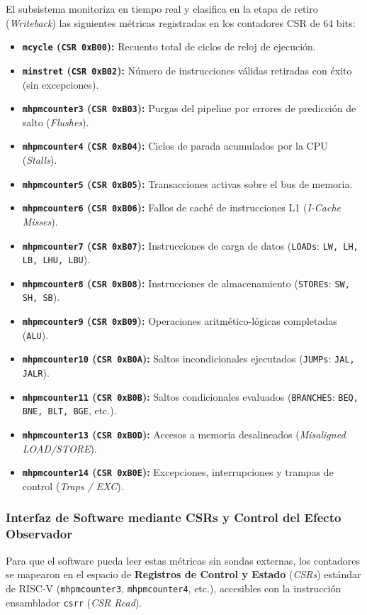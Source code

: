 \documentclass[10pt,a4paper]{article}
\begin{document}
El subsistema monitoriza en tiempo real y clasifica en la etapa de retiro (\textit{Writeback}) las siguientes métricas registradas en los contadores CSR de 64 bits:

\begin{itemize}
    \item \textbf{\texttt{mcycle} (\texttt{CSR 0xB00}):} Recuento total de ciclos de reloj de ejecución.
    \item \textbf{\texttt{minstret} (\texttt{CSR 0xB02}):} Número de instrucciones válidas retiradas con éxito (sin excepciones).
    \item \textbf{\texttt{mhpmcounter3} (\texttt{CSR 0xB03}):} Purgas del pipeline por errores de predicción de salto (\textit{Flushes}).
    \item \textbf{\texttt{mhpmcounter4} (\texttt{CSR 0xB04}):} Ciclos de parada acumulados por la CPU (\textit{Stalls}).
    \item \textbf{\texttt{mhpmcounter5} (\texttt{CSR 0xB05}):} Transacciones activas sobre el bus de memoria.
    \item \textbf{\texttt{mhpmcounter6} (\texttt{CSR 0xB06}):} Fallos de caché de instrucciones L1 (\textit{I-Cache Misses}).
    \item \textbf{\texttt{mhpmcounter7} (\texttt{CSR 0xB07}):} Instrucciones de carga de datos (\texttt{LOADs}: \texttt{LW, LH, LB, LHU, LBU}).
    \item \textbf{\texttt{mhpmcounter8} (\texttt{CSR 0xB08}):} Instrucciones de almacenamiento (\texttt{STOREs}: \texttt{SW, SH, SB}).
    \item \textbf{\texttt{mhpmcounter9} (\texttt{CSR 0xB09}):} Operaciones aritmético-lógicas completadas (\texttt{ALU}).
    \item \textbf{\texttt{mhpmcounter10} (\texttt{CSR 0xB0A}):} Saltos incondicionales ejecutados (\texttt{JUMPs}: \texttt{JAL, JALR}).
    \item \textbf{\texttt{mhpmcounter11} (\texttt{CSR 0xB0B}):} Saltos condicionales evaluados (\texttt{BRANCHES}: \texttt{BEQ, BNE, BLT, BGE}, etc.).
    \item \textbf{\texttt{mhpmcounter13} (\texttt{CSR 0xB0D}):} Accesos a memoria desalineados (\textit{Misaligned LOAD/STORE}).
    \item \textbf{\texttt{mhpmcounter14} (\texttt{CSR 0xB0E}):} Excepciones, interrupciones y trampas de control (\textit{Traps / EXC}).
\end{itemize}

\subsubsection{Interfaz de Software mediante CSRs y Control del Efecto Observador}
Para que el software pueda leer estas métricas sin sondas externas, los contadores se mapearon en el espacio de \textbf{Registros de Control y Estado} 
(\textit{CSRs}) estándar de RISC-V \cite{riscv_spec} (\texttt{mhpmcounter3}, \texttt{mhpmcounter4}, etc.), accesibles con la instrucción ensamblador \texttt{csrr} 
(\textit{CSR Read}).
\end{document}
